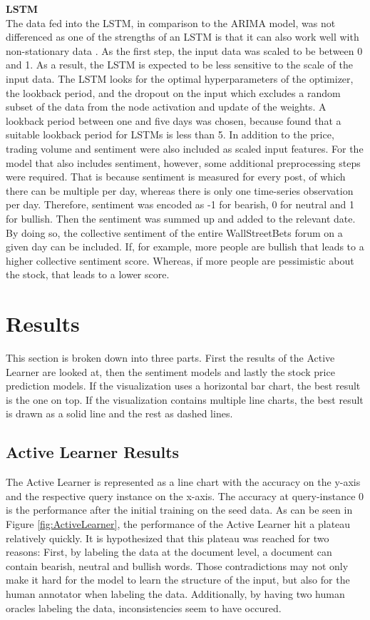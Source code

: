 \documentclass[11pt, a4paper]{article}
\begin{document}
\noindent\textbf{LSTM}\\
The data fed into the LSTM, in comparison to the ARIMA model, was not differenced as one of the strengths of an LSTM is that it can also work well with non-stationary data \citep{preeti2019lstm}.
As the first step, the input data was scaled to be between 0 and 1.
As a result, the LSTM is expected to be less sensitive to the scale of the input data.
The LSTM looks for the optimal hyperparameters of the optimizer, the lookback period, and the dropout on the input which excludes a random subset of the data from the node activation and update of the weights.
A lookback period between one and five days was chosen, because \cite{saud2020lookback} found that a suitable lookback period for LSTMs is less than 5. 
In addition to the price, trading volume and sentiment were also included as scaled input features.
For the model that also includes sentiment, however, some additional preprocessing steps were required. That is because sentiment is measured for every post, of which there
can be multiple per day, whereas there is only one time-series observation per day.
Therefore, sentiment was encoded as -1 for bearish, 0 for neutral and 1 for bullish. Then the sentiment was summed up and added
to the relevant date. 
By doing so, the collective sentiment of the entire WallStreetBets forum on a given day can be included. 
If, for example, more people are bullish that leads to a higher collective sentiment score.
Whereas, if more people are pessimistic about the stock, that leads to a lower score.



\section{Results}

This section is broken down into three parts. First the results of the Active Learner are looked at, then the sentiment models and
lastly the stock price prediction models. If the visualization uses a horizontal bar chart, the best result is the one on top.
If the visualization contains multiple line charts, the best result is drawn as a solid line and the rest as dashed lines.

\subsection{Active Learner Results}
The Active Learner is represented as  a line chart with the accuracy on the y-axis and the respective query instance on the x-axis.
The accuracy at query-instance 0 is the performance after the initial training on the seed data.
As can be seen in Figure \ref{fig:ActiveLearner}, the performance of the Active Learner hit a plateau relatively quickly. It is hypothesized that
this plateau was reached for two reasons: First, by labeling the data at the document level, a document can contain bearish, neutral
and bullish words. Those contradictions may not only make it hard for the model to learn the structure of the input, but also for 
the human annotator when labeling the data.
Additionally, by having two human oracles labeling the data, inconsistencies seem to have occured.
\end{document}
